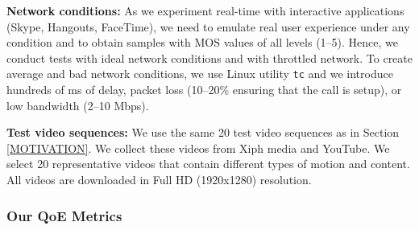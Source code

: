 \noindent \textbf{Network conditions:} As we experiment real-time with interactive applications (Skype, Hangouts, FaceTime), we need to emulate real user experience under any condition and to obtain samples with MOS values of all levels (1--5). Hence, we conduct tests with ideal network conditions and with throttled network. To create average and bad network conditions, we use Linux utility \texttt{tc} and we introduce hundreds of ms of delay, packet loss (10--20\% ensuring that the call is setup), or low bandwidth (2--10 Mbps).  

\noindent \textbf{Test video sequences:} We use the same 20 test video sequences as in Section \ref{MOTIVATION}. 
We collect these videos  from Xiph media \cite{xiph2008org} and YouTube. We select 20 representative videos that contain different types of motion and content.
All videos are downloaded in Full HD (1920x1280) resolution.

\subsubsection{Our QoE Metrics}

